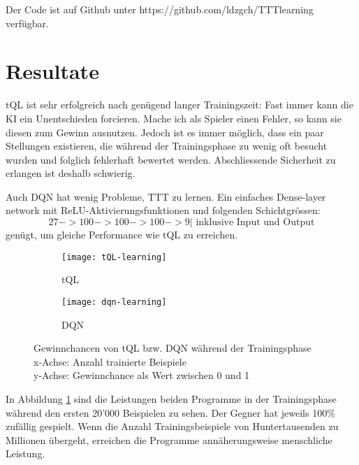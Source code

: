 \documentclass[12pt,a4paper]{article}
\begin{document}
Der Code ist auf Github unter https://github.com/ldzgch/TTTlearning verfügbar.

\newpage

\section{Resultate}

tQL ist sehr erfolgreich nach genügend langer Trainingszeit: Fast immer kann die KI ein Unentschieden forcieren. Mache ich als Spieler einen Fehler, so kann sie diesen zum Gewinn ausnutzen. Jedoch ist es immer möglich, dass ein paar Stellungen existieren, die während der Trainingsphase zu wenig oft besucht wurden und folglich fehlerhaft bewertet werden. Abschliessende Sicherheit zu erlangen ist deshalb schwierig. 
\par
Auch DQN hat wenig Probleme, TTT zu lernen. Ein einfaches Dense-layer network mit ReLU-Aktivierungsfunktionen und folgenden Schichtgrössen:
	$$27 -> 100 -> 100 -> 100 -> 9 | \textrm{ inklusive Input und Output}$$
genügt, um gleiche Performance wie tQL zu erreichen.
\begin{figure}[hbt]
\begin{subfigure}{0.45\textwidth}
\texttt{[image: tQL-learning]}
\caption{tQL}
\end{subfigure}\hfill
\begin{subfigure}{0.45\textwidth}
\texttt{[image: dqn-learning]}
\caption{DQN}
\end{subfigure}
\caption{Gewinnchancen von tQL bzw. DQN während der Trainingsphase\\
x-Achse: Anzahl trainierte Beispiele\\
y-Achse: Gewinnchance als Wert zwischen 0 und 1}
\label{fig:res}
\end{figure}

In Abbildung \ref{fig:res} sind die Leistungen beiden Programme in der Trainingsphase während den ersten 20'000 Beispielen zu sehen. Der Gegner hat jeweils 100\% zufällig gespielt. Wenn die Anzahl Trainingsbeispiele von Huntertausenden zu Millionen übergeht, erreichen die Programme annäherungsweise menschliche Leistung.
\end{document}
